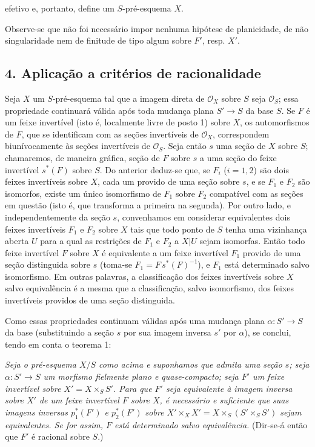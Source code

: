\documentclass[11pt,twoside,openany]{book}
\numberwithin{equation}{section}
\newcommand{\src}[1]{%
  \phantomsection\hypertarget{src:#1}{}%
  \marginpar{\raggedleft\footnotesize\sffamily #1}%
}
\theoremstyle{plain}
\theoremstyle{definition}
\theoremstyle{remark}
\newcommand{\FgaUnitKey}{frontmatter}
\renewcommand{\src}[1]{%
  \phantomsection\hypertarget{src:\FgaUnitKey:#1}{}%
  \marginpar{\raggedleft\footnotesize\sffamily #1}%
}
\begin{document}
\src{322}
efetivo e, portanto, define um $S$-pré-esquema $X$.

Observe-se que não foi necessário impor nenhuma hipótese de planicidade, de
não singularidade nem de finitude de tipo algum sobre $F'$, resp. $X'$.

\subsection*{4. Aplicação a critérios de racionalidade}

Seja $X$ um $S$-pré-esquema tal que a imagem direta de $\mathcal O_X$ sobre
$S$ seja $\mathcal O_S$; essa propriedade continuará válida após toda mudança
plana $S'\longrightarrow S$ da base $S$. Se $F$ é um feixe invertível
(isto é, localmente livre de posto 1) sobre $X$, os automorfismos de $F$, que se
identificam com as seções invertíveis de $\mathcal O_X$, correspondem
biunívocamente às seções invertíveis de $\mathcal O_S$. Seja então $s$
uma seção de $X$ sobre $S$; chamaremos, de maneira gráfica, seção de $F$
sobre $s$ a uma seção do feixe invertível $s^*(F)$ sobre $S$. Do anterior
deduz-se que, se $F_i$ ($i=1,2$) são dois feixes invertíveis sobre $X$, cada um
provido de uma seção sobre $s$, e se $F_1$ e $F_2$ são isomorfos, existe um
único isomorfismo de $F_1$ sobre $F_2$ compatível com as seções em questão
(isto é, que transforma a primeira na segunda). Por outro lado, e
independentemente da seção $s$, convenhamos em considerar equivalentes
dois feixes invertíveis $F_1$ e $F_2$ sobre $X$ tais que todo ponto de $S$ tenha
uma vizinhança aberta $U$ para a qual as restrições de $F_1$ e $F_2$ a
$X|U$ sejam isomorfas. Então todo feixe invertível $F$ sobre $X$ é equivalente
a um feixe invertível $F_1$ provido de uma seção distinguida sobre $s$
(toma-se $F_1=F\,s^*(F)^{-1}$), e $F_1$ está determinado salvo isomorfismo. Em
outras palavras, a classificação dos feixes invertíveis sobre $X$ salvo
equivalência é a mesma que a classificação, salvo isomorfismo, dos feixes
invertíveis providos de uma seção distinguida.

Como essas propriedades continuam válidas após uma mudança plana
$\alpha:S'\longrightarrow S$ da base (substituindo a seção $s$ por sua
imagem inversa $s'$ por $\alpha$), se conclui, tendo em conta o teorema 1:

\emph{Seja o pré-esquema $X/S$ como acima e suponhamos que admita uma seção
$s$; seja $\alpha:S'\longrightarrow S$ um morfismo fielmente plano e
quase-compacto; seja $F'$ um feixe invertível sobre $X'=X\times_SS'$. Para que $F'$
seja equivalente à imagem inversa sobre $X'$ de um feixe invertível $F$ sobre
$X$, é necessário e suficiente que suas imagens inversas $p_1^*(F')$ e
$p_2^*(F')$ sobre $X'\times_XX'=X\times_S(S'\times_SS')$ sejam equivalentes. Se
for assim, $F$ está determinado salvo equivalência.} (Dir-se-á então que $F'$
é racional sobre $S$.)
\end{document}
